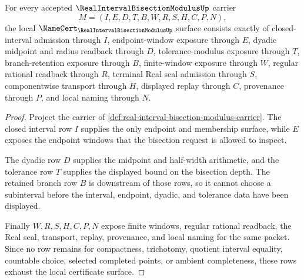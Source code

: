 \begin{theorem}
\label{thm:real-interval-bisection-modulus-namecert-obligations}
For every accepted $\RealIntervalBisectionModulusUp$ carrier
$$
M=(I,E,D,T,B,W,R,S,H,C,P,N),
$$
the local $\NameCert_{\RealIntervalBisectionModulusUp}$ surface consists exactly of closed-interval admission through $I$, endpoint-window exposure through $E$, dyadic midpoint and radius readback through $D$, tolerance-modulus exposure through $T$, branch-retention exposure through $B$, finite-window exposure through $W$, regular rational readback through $R$, terminal Real seal admission through $S$, componentwise transport through $H$, displayed replay through $C$, provenance through $P$, and local naming through $N$.
\end{theorem}
\begin{proof}
Project the carrier of \autoref{def:real-interval-bisection-modulus-carrier}. The closed interval row $I$ supplies the only endpoint and membership surface, while $E$ exposes the endpoint windows that the bisection request is allowed to inspect.

The dyadic row $D$ supplies the midpoint and half-width arithmetic, and the tolerance row $T$ supplies the displayed bound on the bisection depth. The retained branch row $B$ is downstream of those rows, so it cannot choose a subinterval before the interval, endpoint, dyadic, and tolerance data have been displayed.

Finally $W,R,S,H,C,P,N$ expose finite windows, regular rational readback, the Real seal, transport, replay, provenance, and local naming for the same packet. Since no row remains for compactness, trichotomy, quotient interval equality, countable choice, selected completed points, or ambient completeness, these rows exhaust the local certificate surface.
\end{proof}

